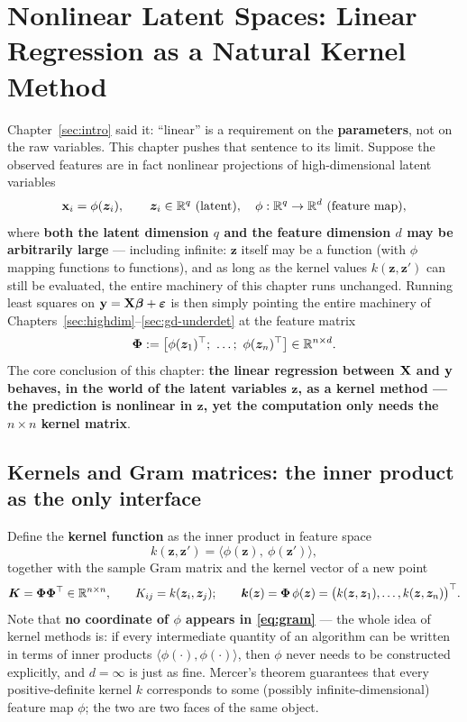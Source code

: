 \section[Nonlinear latent spaces and kernels]{Nonlinear Latent Spaces: Linear Regression as a Natural Kernel Method}\label{sec:kernel}

Chapter~\ref{sec:intro} said it: ``linear'' is a requirement on the \textbf{parameters}, not on the raw variables. This chapter pushes that sentence to its limit. Suppose the observed features are in fact nonlinear projections of high-dimensional latent variables
\begin{equation}\label{eq:feature-map}
  \mathbf{x}_i = \phi(\bm{z}_i), \qquad \bm{z}_i \in \mathbb{R}^q \ \text{(latent)}, \quad \phi : \mathbb{R}^q \to \mathbb{R}^d \ \text{(feature map)},
\end{equation}
where \textbf{both the latent dimension $q$ and the feature dimension $d$ may be arbitrarily large} --- including infinite: $\bm{z}$ itself may be a function (with $\phi$ mapping functions to functions), and as long as the kernel values $k(\bm{z}, \bm{z}')$ can still be evaluated, the entire machinery of this chapter runs unchanged. Running least squares on $\mathbf{y} = \mathbf{X} \bm{\beta} + \bm{\varepsilon}$ is then simply pointing the entire machinery of Chapters~\ref{sec:highdim}--\ref{sec:gd-underdet} at the feature matrix
\[
  \bm{\Phi} := \big[\phi(\bm{z}_1)^\top;\ \dots;\ \phi(\bm{z}_n)^\top\big] \in \mathbb{R}^{n \times d} .
\]
The core conclusion of this chapter: \textbf{the linear regression between $\mathbf{X}$ and $\mathbf{y}$ behaves, in the world of the latent variables $\bm{z}$, as a kernel method --- the prediction is nonlinear in $\bm{z}$, yet the computation only needs the $n \times n$ kernel matrix}.

\subsection{Kernels and Gram matrices: the inner product as the only interface}\label{sec:kernel-def}

Define the \textbf{kernel function} as the inner product in feature space
\begin{equation}\label{eq:kernel}
  k(\bm{z}, \bm{z}') = \big\langle \phi(\bm{z}),\ \phi(\bm{z}') \big\rangle ,
\end{equation}
together with the sample Gram matrix and the kernel vector of a new point
\begin{equation}\label{eq:gram}
  \bm{K} = \bm{\Phi} \bm{\Phi}^\top \in \mathbb{R}^{n \times n},
  \qquad
  K_{ij} = k(\bm{z}_i, \bm{z}_j);
  \qquad
  \bm{k}(\bm{z}) = \bm{\Phi}\, \phi(\bm{z}) = \big( k(\bm{z}, \bm{z}_1), \dots, k(\bm{z}, \bm{z}_n) \big)^\top .
\end{equation}
Note that \textbf{no coordinate of $\phi$ appears in \eqref{eq:gram}} --- the whole idea of kernel methods is: if every intermediate quantity of an algorithm can be written in terms of inner products $\langle \phi(\cdot), \phi(\cdot)\rangle$, then $\phi$ never needs to be constructed explicitly, and $d = \infty$ is just as fine. Mercer's theorem guarantees that every positive-definite kernel $k$ corresponds to some (possibly infinite-dimensional) feature map $\phi$; the two are two faces of the same object\cite{scholkopf2002}.

